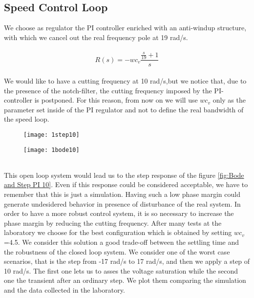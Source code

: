\newpage
\subsection{Speed Control Loop}
We choose as regulator the PI controller enriched with an anti-windup structure, with which we cancel out the real frequency pole at 19 rad/s. \\
\\
\[
R(s)=-wc_v
\frac{\frac{s}{19}+1}{s}
\]
\\

We would like to have a cutting frequency at 10 rad/s,but we notice that, due to the presence of the notch-filter, the cutting frequency imposed by the PI-controller is postponed. For this reason, from now on we will use $wc_v$ only as the parameter set inside of the PI regulator and not to define the real bandwidth of the speed loop.
\\
\begin{figure*}[h]
	\centering
	\begin{subfigure}{0.45\columnwidth}
		\texttt{[image: 1step10]}
	\end{subfigure}
	\begin{subfigure}{0.45\columnwidth}
		\texttt{[image: 1bode10]}
	\end{subfigure}
	\caption{Speed control loop with  $wc_{v} $=10 rad/s}
	\label{fig:Bode and Step PI 10}
\end{figure*}
\\
This open loop system would lead us to the step response of the figure \ref{fig:Bode and Step PI 10}. 
Even if this response could be considered acceptable, we have to remember that this is just a simulation. Having such a low phase margin could generate undesidered behavior in presence of disturbance of the real system. In order to have a more robust control system, it is so necessary to increase the phase margin by reducing the cutting frequency. 
\newline After many tests at the laboratory we choose for the best configuration which is obtained by setting $wc_{v} $=4.5. We consider this solution a good trade-off between the settling time and the robustness of the closed loop system.
We consider one of the worst case scenarios, that is the step from -17 rad/s to 17 rad/s, and then we apply a step of 10 rad/s. The first one lets us to asses the voltage saturation while the second one the transient after an ordinary step.
We plot them comparing the simulation and the data collected in the laboratory.


